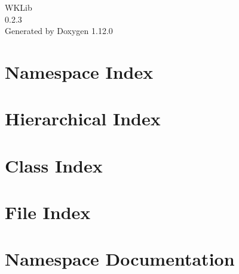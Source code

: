 \documentclass[twoside]{book}
\newcommand{\+}{\discretionary{\mbox{\scriptsize$\hookleftarrow$}}{}{}}
\newcommand{\clearemptydoublepage}{%
    \newpage{\pagestyle{empty}\cleardoublepage}%
  }
\begin{document}
  \raggedbottom
    \hypersetup{pageanchor=false,
                bookmarksnumbered=true,
                pdfencoding=unicode
               }
  \begin{titlepage}
  \vspace*{7cm}
  \begin{center}%
  {\Large WKLib}\\
  [1ex]\large 0.\+2.\+3 \\
  \vspace*{1cm}
  {\large Generated by Doxygen 1.12.0}\\
  \end{center}
  \end{titlepage}
  \clearemptydoublepage
  \tableofcontents
  \clearemptydoublepage
  \hypersetup{pageanchor=true}

\chapter{Namespace Index}

\chapter{Hierarchical Index}

\chapter{Class Index}

\chapter{File Index}

\chapter{Namespace Documentation}

















\end{document}
